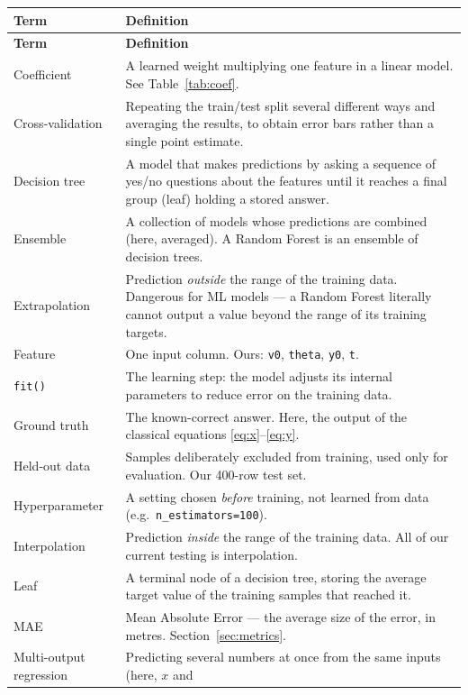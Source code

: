 \documentclass[11pt,a4paper]{article}
\begin{document}
\begin{longtable}{@{}p{3.3cm}p{11.5cm}@{}}
\toprule
\textbf{Term} & \textbf{Definition} \\
\midrule
\endfirsthead
\toprule
\textbf{Term} & \textbf{Definition} \\
\midrule
\endhead
\bottomrule
\endfoot
Coefficient & A learned weight multiplying one feature in a linear model. See
  Table~\ref{tab:coef}. \\
Cross-validation & Repeating the train/test split several different ways and averaging the results,
  to obtain error bars rather than a single point estimate. \\
Decision tree & A model that makes predictions by asking a sequence of yes/no questions about the
  features until it reaches a final group (leaf) holding a stored answer. \\
Ensemble & A collection of models whose predictions are combined (here, averaged). A Random Forest
  is an ensemble of decision trees. \\
Extrapolation & Prediction \emph{outside} the range of the training data. Dangerous for ML models
  --- a Random Forest literally cannot output a value beyond the range of its training targets. \\
Feature & One input column. Ours: \texttt{v0}, \texttt{theta}, \texttt{y0}, \texttt{t}. \\
\texttt{fit()} & The learning step: the model adjusts its internal parameters to reduce error on the
  training data. \\
Ground truth & The known-correct answer. Here, the output of the classical equations
  \eqref{eq:x}--\eqref{eq:y}. \\
Held-out data & Samples deliberately excluded from training, used only for evaluation. Our 400-row
  test set. \\
Hyperparameter & A setting chosen \emph{before} training, not learned from data
  (e.g.\ \texttt{n\_estimators=100}). \\
Interpolation & Prediction \emph{inside} the range of the training data. All of our current testing
  is interpolation. \\
Leaf & A terminal node of a decision tree, storing the average target value of the training samples
  that reached it. \\
MAE & Mean Absolute Error --- the average size of the error, in metres.
  Section~\ref{sec:metrics}. \\
Multi-output regression & Predicting several numbers at once from the same inputs (here, $x$ and

\end{longtable}
\end{document}
